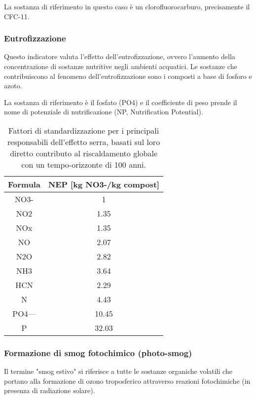 La sostanza di riferimento in questo caso è un clorofluorocarburo, precisamente il CFC-11.
\subsubsection*{Eutrofizzazione}
Questo indicatore valuta l'effetto dell'eutrofizzazione, ovvero l'aumento della concentrazione di sostanze nutritive negli ambienti acquatici. Le sostanze che contribuiscono al fenomeno dell'eutrofizzazione sono i composti a base di fosforo e azoto.

La sostanza di riferimento è il fosfato (PO4) e il coefficiente di peso prende il nome di potenziale di nutrificazione (NP, Nutrification Potential).
\begin{table}[!ht]
    \centering
    \begin{tabular}{|| c | c ||} %
        \hline
        \textbf{Formula} &\textbf{NEP [kg NO3-/kg compost]} \\
        \hline\hline
        NO3-	& 1\\
        \hline
        NO2	&1.35\\
        \hline
        NOx	& 1.35\\
        \hline
        NO	&2.07\\
        \hline
        N2O	&2.82\\
        \hline
        NH3	&3.64\\
        \hline
        HCN	&2.29\\
        \hline
        N	&4.43\\
        \hline
        PO4---	&10.45\\
        \hline
        P	&32.03\\
        \hline
    \end{tabular}
    \caption{Fattori di standardizzazione per i principali responsabili dell'effetto serra, basati sul loro diretto contributo al riscaldamento globale con un tempo-orizzonte di 100 anni.}
    \label{tabellaFattoriEutrofizzazione}
\end{table}
	

\subsubsection*{Formazione di smog fotochimico (photo-smog)}
Il termine "smog estivo" si riferisce a tutte le sostanze organiche volatili che portano alla formazione di ozono troposferico attraverso reazioni fotochimiche (in presenza di radiazione solare).


